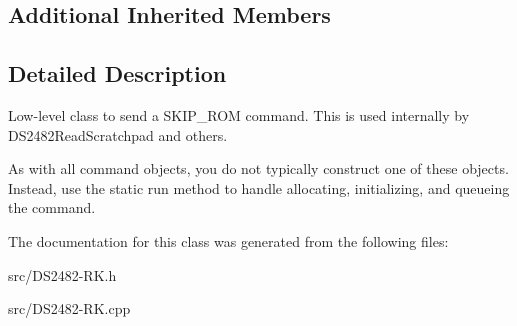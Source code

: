 \subsection*{Additional Inherited Members}


\subsection{Detailed Description}
Low-\/level class to send a S\+K\+I\+P\+\_\+\+R\+OM command. This is used internally by D\+S2482\+Read\+Scratchpad and others. 

As with all command objects, you do not typically construct one of these objects. Instead, use the static run method to handle allocating, initializing, and queueing the command. 

The documentation for this class was generated from the following files\+:\begin{DoxyCompactItemize}
\item 
src/D\+S2482-\/\+R\+K.\+h\item 
src/D\+S2482-\/\+R\+K.\+cpp\end{DoxyCompactItemize}
